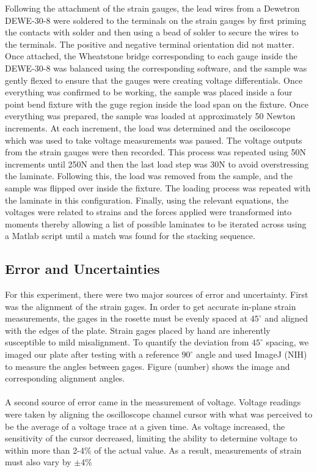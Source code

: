\documentclass[12pt]{article}
\begin{document}
Following the attachment of the strain gauges, the lead wires from a Dewetron DEWE-30-8 were soldered to the terminals on the strain gauges by first priming the contacts with solder and then using a bead of solder to secure the wires to the terminals. The positive and negative terminal orientation did not matter. Once attached, the Wheatstone bridge corresponding to each gauge inside the DEWE-30-8 was balanced using the corresponding software, and the sample was gently flexed to ensure that the gauges were creating voltage differentials. Once everything was confirmed to be working, the sample was placed inside a four point bend fixture with the guge region inside the load span on the fixture. Once everything was prepared, the sample was loaded at approximately 50 Newton increments. At each increment, the load was determined and the osciloscope which was used to take voltage measurements was paused. The voltage outputs from the strain gauges were then recorded. This process was repeated using 50N increments until 250N and then the last load step was 30N to avoid overstressing the laminate. Following this, the load was removed from the sample, and the sample was flipped over inside the fixture. The loading process was repeated with the laminate in this configuration. Finally, using the relevant equations, the voltages were related to strains and the forces applied were transformed into moments thereby allowing a list of possible laminates to be iterated across using a Matlab script until a match was found for the stacking sequence.

\subsection{Error and Uncertainties}%
For this experiment, there were two major sources of error and uncertainty. First was the alignment of the strain gages. In order to get accurate in-plane strain measurements, the gages in the rosette must be evenly spaced at $45^{\circ}$ and aligned with the edges of the plate. Strain gages placed by hand are inherently susceptible to mild misalignment. To quantify the deviation from $45^{\circ}$ spacing, we imaged our plate after testing with a reference $90^{\circ}$ angle and used ImageJ (NIH) to measure the angles between gages. Figure (number) shows the image and corresponding alignment angles. 
\\ \\
A second source of error came in the measurement of voltage. Voltage readings were taken by aligning the oscilloscope channel cursor with what was perceived to be the average of a voltage trace at a given time. As voltage increased, the sensitivity of the cursor decreased, limiting the ability to determine voltage to within more than 2-4\% of the actual value. As a result, measurements of strain must also vary by $\pm 4\%$
\end{document}
